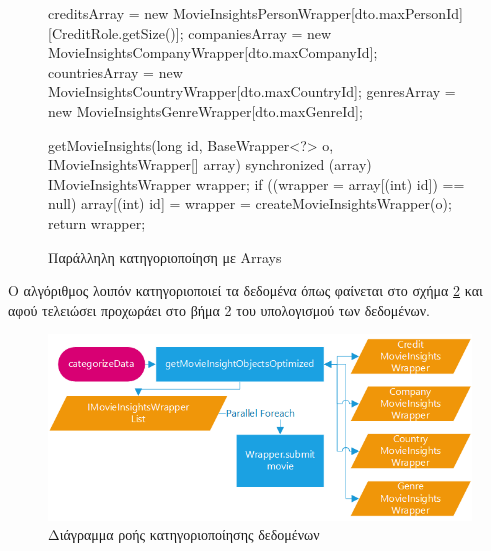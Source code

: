 \begin{figure}[h]
    \begin{javacode}
    creditsArray = new MovieInsightsPersonWrapper[dto.maxPersonId][CreditRole.getSize()];
    companiesArray = new MovieInsightsCompanyWrapper[dto.maxCompanyId];
    countriesArray = new MovieInsightsCountryWrapper[dto.maxCountryId];
    genresArray = new MovieInsightsGenreWrapper[dto.maxGenreId];
    
    getMovieInsights(long id, BaseWrapper<?> o, IMovieInsightsWrapper[] array) {
        synchronized (array) {
            IMovieInsightsWrapper wrapper;
            if ((wrapper = array[(int) id]) == null) {
                array[(int) id] = wrapper = createMovieInsightsWrapper(o);
            }
            return wrapper;
        }
    }
    \end{javacode}
    \caption{Παράλληλη κατηγοριοποίηση με Arrays}
   \label{code:categorieParallelWithArr}
\end{figure}
Ο αλγόριθμος λοιπόν κατηγοριοποιεί τα δεδομένα όπως φαίνεται στο σχήμα \ref{flowchart:categorizeData} και αφού τελειώσει προχωράει στο βήμα 2 του υπολογισμού των δεδομένων.
\begin{figure}[H]
  \centering
  \includegraphics[width=150mm]{Chapters/5 - Architecture/MovieInsights/Images/categorizeData.png}
  \caption{Διάγραμμα ροής κατηγοριοποίησης δεδομένων}
  \label{flowchart:categorizeData}
\end{figure}